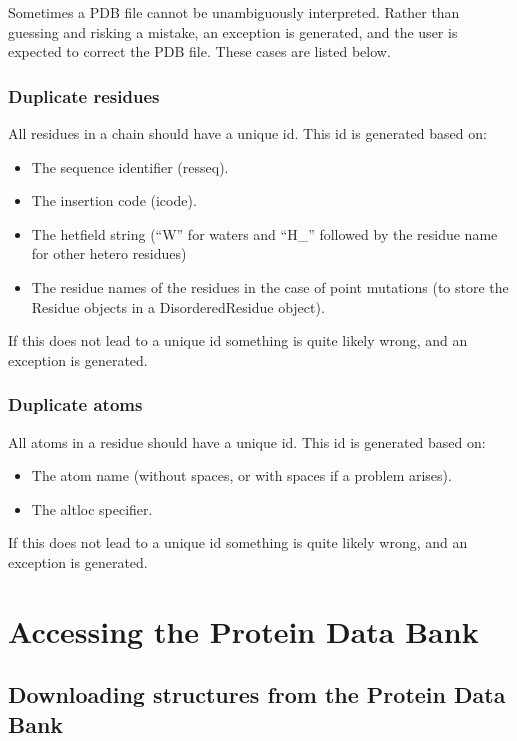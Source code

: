 Sometimes a PDB file cannot be unambiguously interpreted. Rather than guessing
and risking a mistake, an exception is generated, and the user is expected to
correct the PDB file. These cases are listed below.

\subsubsection{Duplicate residues}

All residues in a chain should have a unique id. This id is generated based
on:

\begin{itemize}
\item The sequence identifier (resseq).
\item The insertion code (icode).
\item The hetfield string (``W'' for waters and ``H\_'' followed by the
residue name for other hetero residues)
\item The residue names of the residues in the case of point mutations (to store the
Residue objects in a DisorderedResidue object).
\end{itemize}
If this does not lead to a unique id something is quite likely wrong, and an
exception is generated.

\subsubsection{Duplicate atoms}

All atoms in a residue should have a unique id. This id is generated based on:

\begin{itemize}
\item The atom name (without spaces, or with spaces if a problem arises).
\item The altloc specifier.
\end{itemize}
If this does not lead to a unique id something is quite likely wrong, and an
exception is generated.

\section{Accessing the Protein Data Bank}

\subsection{Downloading structures from the Protein Data Bank}

